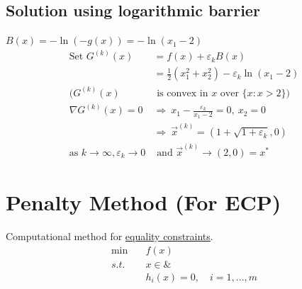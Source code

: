 \documentclass[11pt]{elegantbook}
\begin{document}
\subsection{Solution using logarithmic barrier}
$B(x)=-\ln(-g(x))=-\ln(x_1-2)$
\begin{equation}
    \begin{aligned}
        \text{Set }G^{(k)}(x)&=f(x)+\varepsilon_kB(x)\\
        &=\frac{1}{2}(x_1^2+x_2^2)-\varepsilon_k\ln(x_1-2)\\
        (G^{(k)}(x)&\text{ is convex in $x$ over }\{x:x>2\})\\
        \nabla G^{(k)}(x)=0 &\Rightarrow\ x_1-\frac{\varepsilon_k}{x_1-2}=0,\ x_2=0\\
        &\Rightarrow\ \vec{x}^{(k)}=(1+\sqrt{1+\varepsilon_k},0)\\
        \text{as }k \rightarrow	\infty,\varepsilon_k \rightarrow 0&\text{ and }\vec{x}^{(k)} \rightarrow (2,0)=x^*
    \end{aligned}
    \nonumber
\end{equation}

\section{Penalty Method (For ECP)}
Computational method for \underline{equality constraints}.
\begin{equation}
    \begin{aligned}
        \min\quad &f(x)\\
        s.t.\ &x\in \&\\
        &h_i(x)=0,\quad i=1,...,m
    \end{aligned}
    \nonumber
\end{equation}
\end{document}
